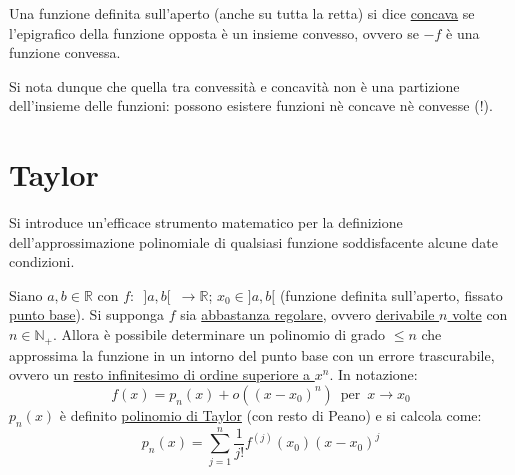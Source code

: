 \documentclass[10pt]{article}
\theoremstyle{plain}
\begin{document}
\begin{defin}
Una funzione definita sull'aperto (anche su tutta la retta) si dice \underline{concava} se l'epigrafico della funzione opposta è un insieme convesso, ovvero se $-f$ è una funzione convessa.
\end{defin}
\begin{oss}
Si nota dunque che quella tra convessità e concavità non è una partizione dell'insieme delle funzioni: possono esistere funzioni nè concave nè convesse (!).
\end{oss}

\section{Taylor}
Si introduce un'efficace strumento matematico per la definizione dell'approssimazione polinomiale di qualsiasi funzione soddisfacente alcune date condizioni.
\begin{ther}
Siano $a, b \in \mathbb{R}$ con $f : \enspace ]a, b[ \enspace \rightarrow \mathbb{R}$; $x_0 \in ]a,b[$ (funzione definita sull'aperto, fissato \underline{punto base}). Si supponga $f$ sia \underline{abbastanza regolare}, ovvero \underline{derivabile $n$ volte} con $n \in \mathbb{N}_+$. Allora è possibile determinare un polinomio di grado $\leq n$ che approssima la funzione in un intorno del punto base con un errore trascurabile, ovvero un \underline{resto infinitesimo di ordine superiore a $x^n$}. In notazione:
\[f(x) = p_n(x) + o ((x - x_0)^n) \enspace \textrm{per} \enspace x \rightarrow x_0\]
$p_n(x)$ è definito \underline{polinomio di Taylor} (con resto di Peano) e si calcola come:
\[p_n(x) = \sum \limits_{j = 1}^n \frac{1}{j!}f^{(j)}(x_0) (x - x_0)^j\]
\end{ther}
\end{document}
